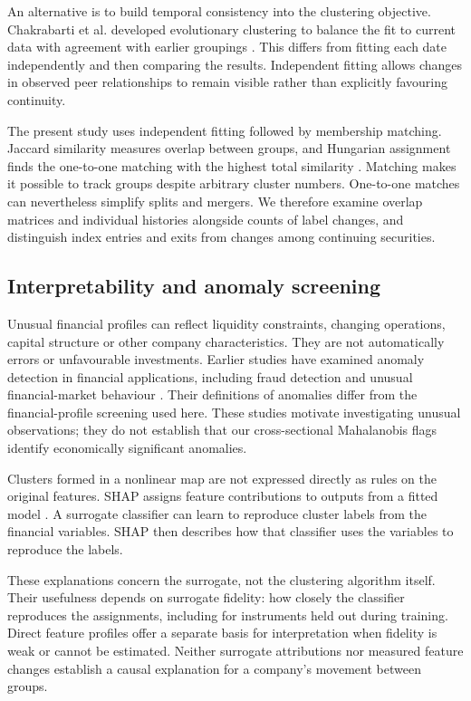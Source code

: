 An alternative is to build temporal consistency into the clustering objective. Chakrabarti et al. developed evolutionary clustering to balance the fit to current data with agreement with earlier groupings \citep{chakrabarti2006}. This differs from fitting each date independently and then comparing the results. Independent fitting allows changes in observed peer relationships to remain visible rather than explicitly favouring continuity.

The present study uses independent fitting followed by membership matching. Jaccard similarity measures overlap between groups, and Hungarian assignment finds the one-to-one matching with the highest total similarity \citep{greene2010,kuhn1955}. Matching makes it possible to track groups despite arbitrary cluster numbers. One-to-one matches can nevertheless simplify splits and mergers. We therefore examine overlap matrices and individual histories alongside counts of label changes, and distinguish index entries and exits from changes among continuing securities.

\subsection{Interpretability and anomaly screening}

Unusual financial profiles can reflect liquidity constraints, changing operations, capital structure or other company characteristics. They are not automatically errors or unfavourable investments. Earlier studies have examined anomaly detection in financial applications, including fraud detection \citep{ahmed2016} and unusual financial-market behaviour \citep{ahmed2017,cheong2021}. Their definitions of anomalies differ from the financial-profile screening used here. These studies motivate investigating unusual observations; they do not establish that our cross-sectional Mahalanobis flags identify economically significant anomalies.

Clusters formed in a nonlinear map are not expressed directly as rules on the original features. SHAP assigns feature contributions to outputs from a fitted model \citep{lundberg2017,merrick2020,rozemberczki2022}. A surrogate classifier can learn to reproduce cluster labels from the financial variables. SHAP then describes how that classifier uses the variables to reproduce the labels.

These explanations concern the surrogate, not the clustering algorithm itself. Their usefulness depends on surrogate fidelity: how closely the classifier reproduces the assignments, including for instruments held out during training. Direct feature profiles offer a separate basis for interpretation when fidelity is weak or cannot be estimated. Neither surrogate attributions nor measured feature changes establish a causal explanation for a company's movement between groups.

